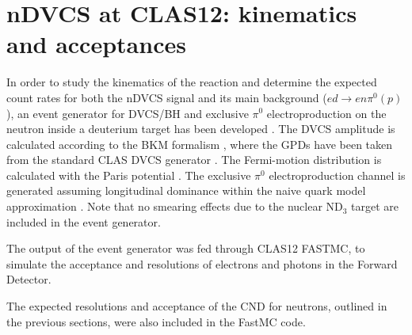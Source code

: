 \section{nDVCS at CLAS12: kinematics and acceptances}
In order to study the kinematics of the reaction and determine the expected count rates for both the nDVCS signal and its main background ($ed\to en\pi^0(p)$), an event generator for DVCS/BH and exclusive $\pi^0$ electroproduction on the neutron inside a deuterium target has been developed \cite{ahmed}. The DVCS amplitude is calculated according to the BKM formalism \cite{belitski}, where the GPDs have been taken from the standard CLAS DVCS generator \cite{harut}. The Fermi-motion distribution is calculated with the Paris potential \cite{paris}. The exclusive $\pi^0$ electroproduction channel is generated assuming longitudinal dominance within the naive quark model approximation \cite{ahmed}. Note that no smearing effects due to the nuclear ND$_3$ target are included in the event generator. 

The output of the event generator was fed through CLAS12 FASTMC, to simulate the acceptance and resolutions of electrons and photons in the Forward Detector. 

The expected resolutions and acceptance of the CND for neutrons, outlined in the previous sections, were also included in the FastMC code. 

